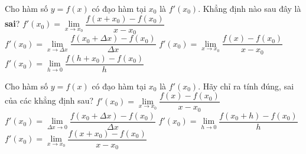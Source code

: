 \begin{ex}%
	Cho hàm số $y=f(x)$ có đạo hàm tại $x_0$ là $f'(x_0)$. Khẳng định nào sau  đây là \textbf{sai}?
	\choice 
		{\True  $f'(x_0)=\lim\limits_{x\to x_0}\dfrac{f(x+x_0)-f(x_0)}{x-x_0}$}
		{$f'(x_0)=\lim\limits_{x\to \Delta x}\dfrac{f(x_0+\Delta  x)-f(x_0)}{\Delta x}$}
		{$f'(x_0)=\lim\limits_{x\to  x_0}\dfrac{f(x)-f(x_0)}{x-x_0}$}
		{$f'(x_0)=\lim\limits_{h\to 0}\dfrac{f(h+x_0)-f(x_0)}{h}$} 
\end{ex}

\begin{ex}%
 Cho hàm số $y=f(x)$ có đạo hàm tại $x_0$ là $f'(x_0)$.  Hãy chỉ ra tính đúng, sai của các khẳng định sau?
 \choiceTF 
  {\True  $f'(x_0)=\lim \limits_{x\to x_0} \dfrac{f(x)-f(x_0)}{x-x_0}$}
  {\True  $f'(x_0)=\lim \limits_{\Delta x\to 0} \dfrac{f(x_0+\Delta x)-f(x_0)}{\Delta x}$}
   {\True $f'(x_0)=\lim \limits_{h\to 0} \dfrac{f(x_0+h)-f(x_0)}{h}$}
  {$f'(x_0)=\lim \limits_{x\to x_0} \dfrac{f(x+x_0)-f(x_0)}{x-x_0}$} 
\end{ex}

